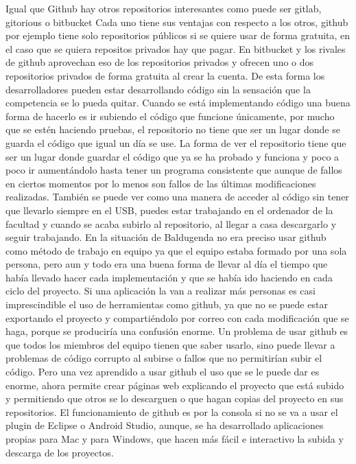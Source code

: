 
Igual que Github hay otros repositorios interesantes como puede ser gitlab, gitorious o bitbucket
Cada uno tiene sus ventajas con respecto a los otros, github por ejemplo tiene solo repositorios públicos si se quiere usar de forma gratuita, en el caso que se quiera repositos privados hay que pagar.
En bitbucket y los rivales de github aprovechan eso de los repositorios privados y ofrecen uno o dos repositorios privados de forma gratuita al crear la cuenta.
De esta forma los desarrolladores pueden estar desarrollando código sin la sensación que la competencia se lo pueda quitar.
Cuando se está implementando código una buena forma de hacerlo es ir subiendo el código que funcione únicamente, por mucho que se estén haciendo pruebas, el repositorio no tiene que ser un lugar donde se guarda el código que igual un día se use.
La forma de ver el repositorio tiene que ser un lugar donde guardar el código que ya se ha probado y funciona y poco a poco ir aumentándolo hasta tener un programa consistente que aunque de fallos en ciertos momentos por lo menos son fallos de las últimas modificaciones realizadas.
También se puede ver como una manera de acceder al código sin tener que llevarlo siempre en el USB, puedes estar trabajando en el ordenador de la facultad y cuando se acaba subirlo al repositorio, al llegar a casa descargarlo y seguir trabajando.
En la situación de Baldugenda no era preciso usar github como método de trabajo en equipo ya que el equipo estaba formado por una sola persona, pero aun y todo era una buena forma de llevar al día el tiempo que había llevado hacer cada implementación y que se había ido haciendo en cada ciclo del proyecto.
Si una aplicación la van a realizar más personas es casi imprescindible el uso de herramientas como github, ya que no se puede estar exportando el proyecto y compartiéndolo por correo con cada modificación que se haga, porque se produciría una confusión enorme.
Un problema de usar github es que todos los miembros del equipo tienen que saber usarlo, sino puede llevar a problemas de código corrupto al subirse o fallos que no permitirían subir el código. Pero una vez aprendido a usar github el uso que se le puede dar es enorme, ahora permite crear páginas web explicando el proyecto que está subido y permitiendo que otros se lo descarguen o que hagan copias del proyecto en sus repositorios.
El funcionamiento de github es por la consola si no se va a usar el plugin de Eclipse o Android Studio, aunque, se ha desarrollado aplicaciones propias para Mac  y para Windows, que hacen más fácil e interactivo la subida y descarga de los proyectos.

